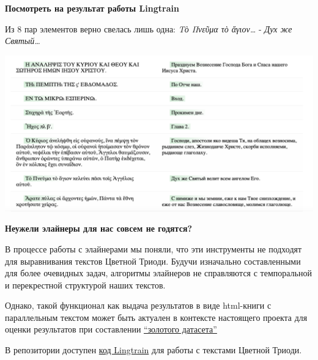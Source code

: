 \documentclass[
  letterpaper,
]{book}
\begin{document}
\begin{tcolorbox}[enhanced jigsaw, toprule=.15mm, colframe=quarto-callout-caution-color-frame, colback=white, left=2mm, arc=.35mm, leftrule=.75mm, bottomrule=.15mm, rightrule=.15mm, opacityback=0, breakable]

\textbf{Посмотреть на результат работы Lingtrain}\vspace{2mm}

Из 8 пар элементов верно свелась лишь одна: \emph{Τὸ Πνεῦμα τὸ
ἄγιον\ldots{}} - \emph{Дух же Святый\ldots{}}

\includegraphics{images/lingtrain_faulty_result.png}

\end{tcolorbox}

\begin{tcolorbox}[enhanced jigsaw, toprule=.15mm, colframe=quarto-callout-note-color-frame, colback=white, left=2mm, arc=.35mm, leftrule=.75mm, bottomrule=.15mm, rightrule=.15mm, opacityback=0, breakable]

\textbf{Неужели элайнеры для нас совсем не годятся?}\vspace{2mm}

В процессе работы с элайнерами мы поняли, что эти инструменты не
подходят для выравнивания текстов Цветной Триоди. Будучи изначально
составленными для более очевидных задач, алгоритмы элайнеров не
справляются с темпоральной и перекрестной структурой наших текстов.

Однако, такой функционал как выдача результатов в виде html-книги с
параллельным текстом может быть актуален в контексте настоящего проекта
для оценки результатов при составлении
\protect\hyperlink{sec-about_evluation}{``золотого датасета''}

\end{tcolorbox}

В репозитории доступен
\href{https://github.com/Drozhzhinastya/GSPC/blob/main/scripts/aligners/Lingtrain_LABse.ipynb}{код
Lingtrain} для работы с текстами Цветной Триоди.
\end{document}
